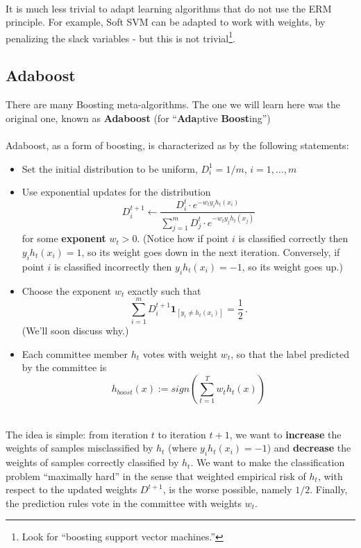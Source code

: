 \documentclass[11pt]{article}
\begin{document}
~\\
It is much less trivial to adapt learning algorithms that do not use the ERM
principle. For example, Soft SVM can be adapted to work with weights, 
by penalizing the slack
variables - but this is not trivial\footnote{Look for ``boosting support vector
machines.''}.



\subsection{Adaboost}

There are many Boosting meta-algorithms. The one we will learn here was the
original one, known as {\bf Adaboost} (for ``{\bf Ada}ptive {\bf Boost}ing'')
\\~\\
Adaboost, as a form of boosting, is characterized as by the following statements:
\begin{itemize}
  \item Set the initial distribution to be uniform, $D^1_i=1/m$, $i=1,\ldots,m$
  \item Use exponential updates for the distribution
    \[
      D^{t+1}_i \leftarrow \frac{D^t_i \cdot e^{-w_t y_i h_t(x_i)} }
      {\sum_{j=1}^m  D^t_j \cdot e^{-w_t y_j h_t(x_j)} }
    \]
    for some {\bf exponent} $w_t>0$. (Notice how if point  $i$ is classified
      correctly then $ y_i h_t(x_i)=1$,  so its weight goes down in the next
      iteration. Conversely, if point  $i$ is classified
    incorrectly then $ y_i h_t(x_i)=-1$,  so its weight goes up.)
  \item Choose the exponent $w_t$ exactly such that
    \[
      \sum_{i=1}^m D^{t+1}_i\mathbf{1}_{[y_i \neq h_t(x_i)]} = \frac{1}{2}\,.
    \]
    (We'll soon discuss why.)
  \item Each committee member $h_t$ votes with weight $w_t$, so that the
    label predicted by the committee is
    \[
      h_{boost}(x) := sign\left( \sum_{t=1}^T w_t h_t(x) \right)
    \]
\end{itemize}
~\\
The idea is simple: from iteration $t$ to iteration $t+1$, we want to {\bf
increase}
the weights of samples misclassified  by $h_t$ (where $y_i h_t(x_i)=-1$) and {\bf decrease}
the weights of samples correctly classified by $h_t$. We want to make the
classification problem ``maximally hard'' in the sense that weighted empirical
risk of $h_t$, with respect to the updated weights $D^{t+1}$, is the worse
possible, namely $1/2$.
Finally, the prediction rules vote in the committee with weights $w_t$.
\end{document}
